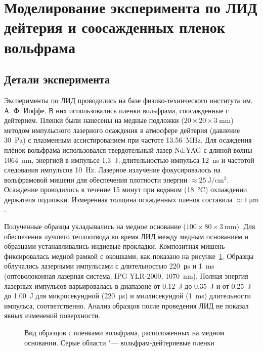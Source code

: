 \section{Моделирование эксперимента по ЛИД дейтерия и соосажденных пленок вольфрама}\label{sec:ch4/sec1}

\subsection{Детали эксперимента}\label{subsec:ch4/sec1/subsec1}

Эксперименты по ЛИД проводились на базе физико-технического института им. А. Ф. Иоффе. В них использовались пленки вольфрама, соосажденные с дейтерием. Пленки были нанесены на медные подложки ($20 \times 20 \times \SI{3}{\milli\metre}$) методом импульсного лазерного осаждения в атмосфере дейтерия (давление \SI{30}{\pascal}) с плазменным ассистированием при частоте \SI{13.56}{\mega\hertz}. Для осаждения плёнок вольфрама использовался твердотельный лазер Nd:YAG с длиной волны \SI{1064}{\nano\meter}, энергией в импульсе \SI{1.3}{\joule}, длительностью импульса \SI{12}{\nano\second} и частотой следования импульсов \SI{10}{\hertz}. Лазерное излучение фокусировалось на вольфрамовой мишени для обеспечения плотности энергии $\approx\SI{25}{\joule\per\centi\meter\squared}$. Осаждение проводилось в течение 15 минут при водяном (\SI{18}{\degreeCelsius}) охлаждении держателя подложки. Измеренная толщина осажденных пленок составила $\approx\SI{1}{\micro\metre}$.

Полученные образцы укладывались на медное основание ($100 \times 80 \times \SI{3}{\milli\metre}$). Для обеспечения лучшего теплоотвода во время ЛИД между медным основанием и образцами устанавливались индиевые прокладки. Композитная мишень фиксировалась медной рамкой с окошками, как показано на рисунке~\cref{fig:ch4/LID_target}. Образцы облучались лазерными импульсами с длительностью \SI{220}{\micro\second} и \SI{1}{\milli\second} (оптоволоконная лазерная система, IPG YLR-2000, \SI{1070}{\nano\metre}). Полная энергия лазерных импульсов варьировалась в диапазоне от \SI{0.12}{\joule} до \SI{0.35}{\joule} и от \SI{0.25}{\joule} до \SI{1.00}{\joule} для микросекундной (\SI{220}{\micro\second}) и миллисекундой (\SI{1}{\milli\second}) длительности импульса, соответственно. Анализ образцов после проведения ЛИД не показал явных изменений поверхности.

\begin{figure}[ht]
    \caption{Вид образцов с пленками вольфрама, расположенных на медном основании. Серые области "--- вольфрам-дейтериевые пленки}\label{fig:ch4/LID_target}
\end{figure}

